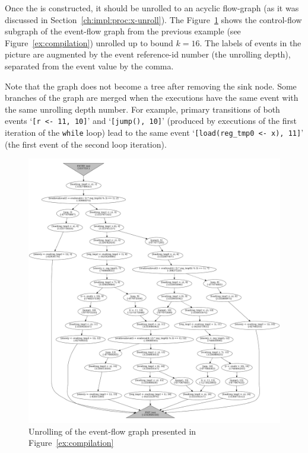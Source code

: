 Once the \xgraph[CF] is constructed, it should be unrolled to an acyclic flow-graph (as it was discussed in Section~\ref{ch:impl:proc:x-unroll}).
The Figure~\ref{ex:unrolling} shows the control-flow subgraph  of the event-flow graph from the previous example (see Figure~\ref{ex:compilation}) unrolled up to bound $k=16$.
The labels of events in the picture are augmented by the event reference-id number (the unrolling depth), separated from the event value by the comma.

Note that the graph does not become a tree after removing the sink node.
Some branches of the graph are merged when the executions have the same event with the same unrolling depth number.
For example, primary transitions of both events `\lstinline{[r <- 11, 10]}' and `\lstinline{[jump(), 10]}' (produced by executions of the first iteration of the \texttt{while} loop) lead to the same event `\lstinline{[load(reg_tmp0 <- x), 11]}' (the first event of the second loop iteration).


\begin{figure}[!h]
\includegraphics[width=\textwidth,keepaspectratio]{img/my/graphs/test_unrolled.png}
\caption{Unrolling of the event-flow graph presented in Figure~\ref{ex:compilation}}
\label{ex:unrolling}
\end{figure}


